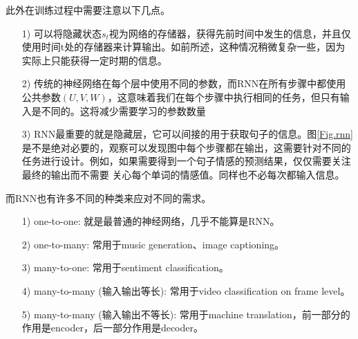 \documentclass[supercite]{HustGraduPaper}
\theoremstyle{definition}
\begin{document}
此外在训练过程中需要注意以下几点。
\begin{itemize}
  \item [1)] 可以将隐藏状态$s_t$视为网络的存储器，获得先前时间中发生的信息，并且仅使用时间t处的存储器来计算输出。如前所述，这种情况稍微复杂一些，因为实际上只能获得一定时期的信息。
  \item [2)] 传统的神经网络在每个层中使用不同的参数，而RNN在所有步骤中都使用公共参数$(U,V,W)$，这意味着我们在每个步骤中执行相同的任务，但只有输入是不同的。这将减少需要学习的参数数量
  \item [3)] RNN最重要的就是隐藏层，它可以间接的用于获取句子的信息。图\ref{Fig.rnn}是不是绝对必要的，观察可以发现图中每个步骤都在输出，这需要针对不同的任务进行设计。例如，如果需要得到一个句子情感的预测结果，仅仅需要关注最终的输出而不需要
  关心每个单词的情感值。同样也不必每次都输入信息。
\end{itemize}

而RNN也有许多不同的种类来应对不同的需求。
\begin{itemize}
  \item [1)] one-to-one: 就是最普通的神经网络，几乎不能算是RNN。
  \item [2)] one-to-many: 常用于music generation、image captioning。
  \item [3)] many-to-one: 常用于sentiment classification。
  \item [4)] many-to-many (输入输出等长): 常用于video classification on frame level。
  \item [5)] many-to-many (输入输出不等长): 常用于machine translation，前一部分的作用是encoder，后一部分作用是decoder。
\end{itemize}
\end{document}
